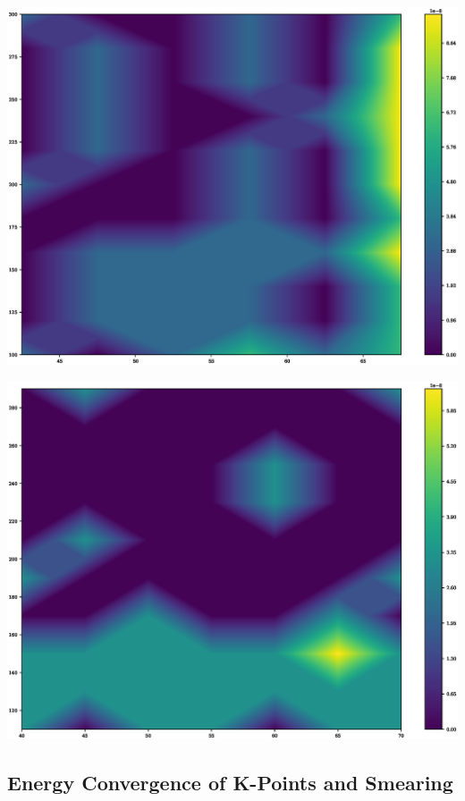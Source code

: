 \begin{center}
\includegraphics[scale=0.35]{appendix/dft_calibration/al/ecut2d_force_wfcconv_ry_colour}
\end{center}

\begin{center}
\includegraphics[scale=0.35]{appendix/dft_calibration/al/ecut2d_force_rhoconv_ry_colour}
\end{center}


\FloatBarrier
\subsection{Energy Convergence of K-Points and Smearing}

